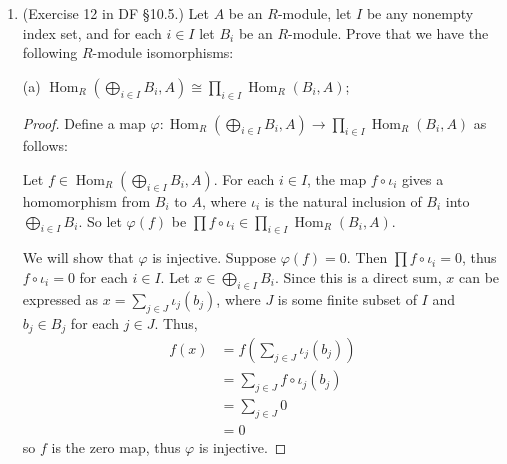 \documentclass[10pt]{article}
\DeclareMathOperator*{\Hom}{Hom}
\DeclareMathOperator*{\im}{Im}
\begin{document}
\begin{enumerate}
\begin{proof}
$\delta$ is injective, so $\theta(c) = 1$.  So $c \in \ker (\theta) = \im(\varphi)$, by exactness, thus there exists $b \in B$ such that $\varphi(b) = c$.

By commutativity, $\varphi'(\beta(b)) = \gamma(\varphi(b)) = \gamma(c) = \varphi'(b')$.  So $\varphi'(\beta(b))\cdot (\varphi'(b'))^{-1} = \varphi'(\beta(b) \cdot (b')^{-1}) = 1$.  Hence, $\beta(b) \cdot (b')^{-1} \in \ker \varphi' = \im(\psi')$, so there exists $a' \in A'$ such that $\psi'(a') = \beta(b) \cdot (b')^{-1}$.

Since $\alpha$ is surjective, there exists $a \in A$ such that $\alpha(a) = a'$.  By exactness, $\beta(\psi(a)) = \psi'(\alpha(a)) = \psi'(a') = \beta(b) \cdot (b')^{-1}$.  So $b' = \beta(\psi(a))^{-1} \cdot \beta(b) = \beta(\psi(a^{-1})\cdot b)$.  Therefore, $\beta$ is surjective.
\end{proof}

\item (Exercise 12 in DF \S 10.5.) Let $A$ be an $R$-module, let $I$ be any nonempty index set, and for each $i \in I$ let $B_i$ be an $R$-module.  Prove that we have the following $R$-module isomorphisms:

(a) $\Hom_R(\bigoplus_{i \in I} B_i, A) \cong \prod_{i \in I} \Hom_R(B_i,A)$;

\begin{proof}
Define a map $\varphi: \Hom_R(\bigoplus_{i \in I} B_i, A) \rightarrow \prod_{i \in I} \Hom_R(B_i,A)$ as follows:

Let $f \in \Hom_R(\bigoplus_{i \in I} B_i, A)$.  For each $i \in I$, the map $f \circ \iota_i$ gives a homomorphism from $B_i$ to $A$, where $\iota_i$ is the natural inclusion of $B_i$ into $\bigoplus_{i \in I} B_i$.  So let $\varphi(f)$ be $\prod f \circ \iota_i \in \prod_{i \in I} \Hom_R(B_i,A)$.


We will show that $\varphi$ is injective.  Suppose $\varphi(f) = 0$.  Then $\prod f \circ \iota_i = 0$, thus $f \circ \iota_i = 0$ for each $i \in I$.  Let $x \in \bigoplus_{i \in I} B_i$.  Since this is a direct sum, $x$ can be expressed as $x = \sum_{j \in J} \iota_j(b_j)$, where $J$ is some finite subset of $I$ and $b_j \in B_j$ for each $j \in J$.  Thus,
\begin{align*}
f(x) &= f(\sum_{j \in J} \iota_j(b_j))
\\
&= \sum_{j \in J} f \circ \iota_j(b_j)
\\
&= \sum_{j \in J} 0
\\
&= 0
\end{align*}
so $f$ is the zero map, thus $\varphi$ is injective.


\end{proof}
\end{enumerate}
\end{document}
